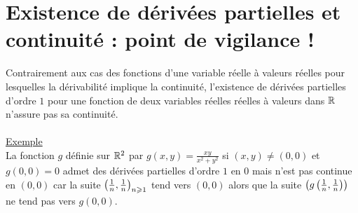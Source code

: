 \section{Existence de dérivées partielles et continuité : point de vigilance !}
\begin{defprop}
    Contrairement aux cas des fonctions d’une variable réelle à valeurs réelles pour lesquelles la dérivabilité implique la continuité, l’existence de dérivées partielles d’ordre \(1\) pour une fonction de deux variables réelles réelles à valeurs dans \(\mathbb{R}\) n’assure pas sa continuité.\\~\\
    \underline{Exemple}\\
    La fonction \(g\) définie sur \(\mathbb{R}^2\) par \(g(x, y) = \frac{xy}{x^2 + y^2}\) si \((x, y)\neq (0, 0)\) et \(g(0, 0) = 0\) admet des dérivées partielles d’ordre \(1\) en \(0\) mais n’est pas continue en \((0, 0)\) car la suite \(\left(\frac{1}{n} , \frac{1}{n} \right)_{n\geqslant 1}\) tend vers \((0, 0)\) alors que la suite \(\left(g\left( \frac{1}{n} , \frac{1}{n}\right)\right)\) ne tend pas vers \(g(0, 0)\).
\end{defprop}
